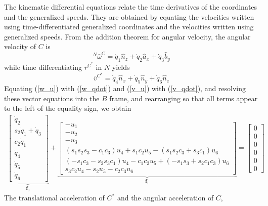 \documentclass[smallcondensed,final]{svjour3}                     %
\begin{document}
The kinematic differential equations relate the time derivatives of the
coordinates and the generalized speeds. They are obtained by equating the
velocities written using time-differentiated generalized coordinates and the
velocities written using generalized speeds. From the addition theorem for
angular velocity, the angular velocity of $C$ is
\begin{equation}
  \label{w_qdot}
  {^N}\bar{\omega}^C = \dot{q}_1 \hat{n}_z + \dot{q}_2 \hat{a}_x + \dot{q}_3 \hat{b}_y
\end{equation}
while time differentiating $\bar{r}^{C^*}$ in $N$ yields
\begin{equation}
  \label{v_qdot}
  \bar{v}^{C^*} = \dot{q}_4 \hat{n}_x + \dot{q}_5 \hat{n}_y + \dot{q}_6 \hat{n}_z
\end{equation}
Equating (\ref{w_u}) with (\ref{w_qdot}) and (\ref{v_u}) with (\ref{v_qdot}),
and resolving these vector equations into the $B$ frame, and rearranging so
that all terms appear to the left of the equality sign, we obtain
\begin{align}
    \label{rd:f_0_f_1}
\underbrace{\left[\begin{matrix}\dot{q}_{2}\\s_2
    \dot{q}_{1} + \dot{q}_{3}\\ c_2
    \dot{q}_{1}\\\dot{q}_{4}\\\dot{q}_{5}\\\dot{q}_{6}\end{matrix}\right]}_{\mathbf{f}_0}
    +
\underbrace{\left[\begin{matrix}- u_{1}\\- u_{2}\\- u_{3}\\
\left(s_1 s_2 s_3 - c_1c_3\right)u_4 +
s_1 c_2 u_5 - \left(s_1 s_2c_3 +
s_3c_1\right)u_6 \\
%
\left(-s_1c_3 - s_2 s_3c_1\right)u_4 -
c_1c_2 u_5 +
\left(-s_1 s_3 + s_2c_1c_3\right)u_6
\\
%
s_3c_2u_4  - s_2u_5 - c_2c_3u_6
\end{matrix}\right]}_{\mathbf{f}_1}
    = \left[\begin{matrix} 0\\ 0\\ 0\\ 0\\ 0\\ 0\end{matrix}\right]
\end{align}
The translational acceleration of $C^*$ and the angular acceleration of $C$,
\end{document}

